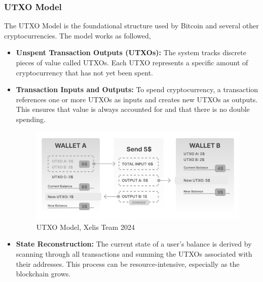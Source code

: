 \documentclass[12pt,a4paper,twocolumn]{article}
\begin{document}
\subsubsection{UTXO Model}

The UTXO Model is the foundational structure used by Bitcoin and several other cryptocurrencies. The model works as followed,\\

\begin{itemize}
    \item \textbf{Unspent Transaction Outputs (UTXOs):} The system tracks discrete pieces of value called UTXOs. Each UTXO represents a specific amount of cryptocurrency that has not yet been spent.\\
    
    \item \textbf{Transaction Inputs and Outputs:} To spend cryptocurrency, a transaction references one or more UTXOs as inputs and creates new UTXOs as outputs. This ensures that value is always accounted for and that there is no double spending.\\
   
\begin{figure}
\centering
\includegraphics[width=1\linewidth]{Frame 1 (8).png}
\caption{UTXO Model, Xelis Team 2024}
\end{figure}
  
    \item \textbf{State Reconstruction:} The current state of a user's balance is derived by scanning through all transactions and summing the UTXOs associated with their addresses. This process can be resource-intensive, especially as the blockchain grows.\\
\end{itemize}
\end{document}
